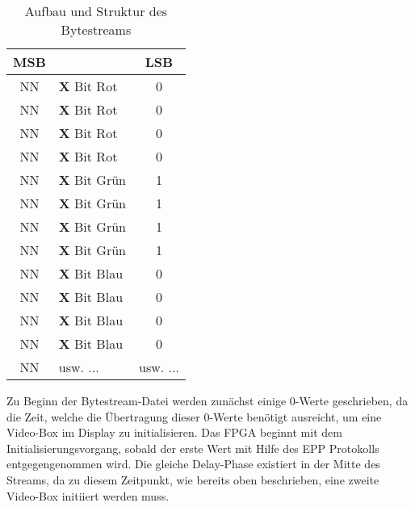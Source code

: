 \begin{table}[h]
	\begin{center}
		\begin{tabular}{c l c}
		\hline
		\textbf{MSB} & & \textbf{LSB}\\
		\hline		\hline
		NN & \textbf{X} Bit Rot & 0\\
		NN & \textbf{X} Bit Rot & 0\\
		NN & \textbf{X} Bit Rot & 0\\
		NN & \textbf{X} Bit Rot & 0\\	
		NN & \textbf{X} Bit Grün & 1\\								
		NN & \textbf{X} Bit Grün & 1\\			
		NN & \textbf{X} Bit Grün & 1\\								
		NN & \textbf{X} Bit Grün & 1\\	
		NN & \textbf{X} Bit Blau & 0\\								
		NN & \textbf{X} Bit Blau & 0\\						
		NN & \textbf{X} Bit Blau & 0\\						
		NN & \textbf{X} Bit Blau & 0\\ 			
		NN & usw. ... & usw. ...\\																									
		\hline
		\end{tabular}
		\caption{Aufbau und Struktur des Bytestreams}
		\label{tab:bytestream}
	\end{center}
\end{table}
Zu Beginn der Bytestream-Datei werden zunächst einige 0-Werte geschrieben, da die Zeit, welche die Übertragung dieser 0-Werte benötigt ausreicht, um eine Video-Box im Display zu initialisieren. Das FPGA beginnt mit dem Initialisierungsvorgang, sobald der erste Wert mit Hilfe des EPP Protokolls entgegengenommen wird. Die gleiche Delay-Phase existiert in der Mitte des Streams, da zu diesem Zeitpunkt, wie bereits oben beschrieben, eine zweite Video-Box initiiert werden muss. 
 


